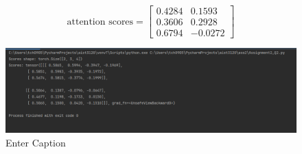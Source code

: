 \documentclass[12pt]{article}
\begin{document}
\[
\text{attention scores}=
\begin{bmatrix}
0.4284 & 0.1593 \\
0.3606 & 0.2928 \\
0.6794 & -0.0272
\end{bmatrix}
\]
\newpage



\begin{figure}
    \centering
    \includegraphics[width=1\linewidth]{2.png}
    \caption{Enter Caption}
    \label{fig:enter-label}
\end{figure}
\end{document}
